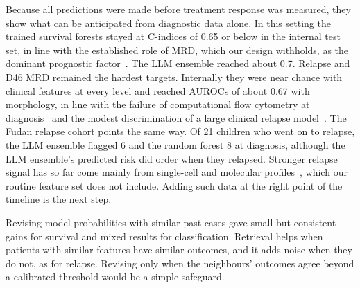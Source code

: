\documentclass[pdflatex,sn-nature]{sn-jnl}
\begin{document}
Because all predictions were made before treatment response was
measured, they show what can be anticipated from diagnostic data
alone.
In this setting the trained survival forests stayed at C-indices of
0.65 or below in the internal test set, in line with the established
role of MRD, which our design withholds, as the dominant prognostic
factor~\cite{[CITE:Borowitz2008],[CITE:Conter2010]}.
The LLM ensemble reached about 0.7.
Relapse and D46 MRD remained the hardest targets.
Internally they were near chance with clinical features at every level
and reached AUROCs of about 0.67 with morphology, in line with the
failure of computational flow cytometry at
diagnosis~\cite{[CITE:Martinez2025]} and the modest discrimination of a
large clinical relapse model~\cite{[CITE:Saravanan2026]}.
The Fudan relapse cohort points the same way.
Of 21 children who went on to relapse, the LLM ensemble flagged 6 and
the random forest 8 at diagnosis, although the LLM ensemble's predicted
risk did order when they relapsed.
Stronger relapse signal has so far come mainly from single-cell and
molecular profiles~\cite{[CITE:Good2018],[CITE:Mosquera2024]}, which our
routine feature set does not include.
Adding such data at the right point of the timeline is the next step.

Revising model probabilities with similar past cases gave small but
consistent gains for survival and mixed results for classification.
Retrieval helps when patients with similar features have similar
outcomes, and it adds noise when they do not, as for relapse.
Revising only when the neighbours' outcomes agree beyond a calibrated
threshold would be a simple safeguard.
\end{document}
